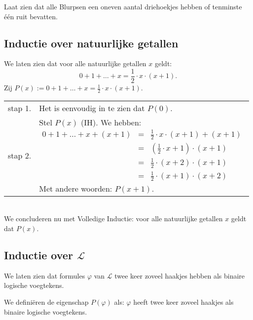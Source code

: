 \begin{exercise}
Laat zien dat alle Blurpsen een oneven aantal driehoekjes hebben of tenminste \'e\'en ruit bevatten.
\end{exercise}

\subsection*{Inductie over natuurlijke getallen}
We laten zien dat voor alle natuurlijke getallen $x$ geldt:
$$0+1+\ldots +x=\frac{1}{2}\cdot x\cdot (x+1).$$
Zij $P(x) :=0+1+\ldots +x=\frac{1}{2}\cdot x\cdot (x+1)$.

\noindent\begin{tabular}{lp{}}
stap 1. & Het is eenvoudig in te zien dat $P(0)$.\\
stap 2. & Stel $P(x)$ (IH). We hebben:
\begin{eqnarray*}
0+1+\ldots+x+(x+1) &=& \frac{1}{2}\cdot x\cdot(x+1)+(x+1)\\
&=&(\frac{1}{2}\cdot x+1)\cdot(x+1)\\
&=& \frac{1}{2}\cdot(x+2)\cdot(x+1)\\
&=& \frac{1}{2}\cdot(x+1)\cdot(x+2)
\end{eqnarray*}
Met andere woorden: $P(x+1)$.
\end{tabular}\\
We concluderen nu met Volledige Inductie: voor alle natuurlijke getallen $x$ geldt dat $P(x)$.


\subsection*{Inductie over $\mathcal{L}$}
We laten zien dat formules $\varphi$ van $\mathcal{L}$ twee keer zoveel haakjes hebben als binaire logische voegtekens.

We defini\"eren de eigenschap $P(\varphi)$ als: $\varphi$ heeft twee keer zoveel haakjes als binaire logische voegtekens.

